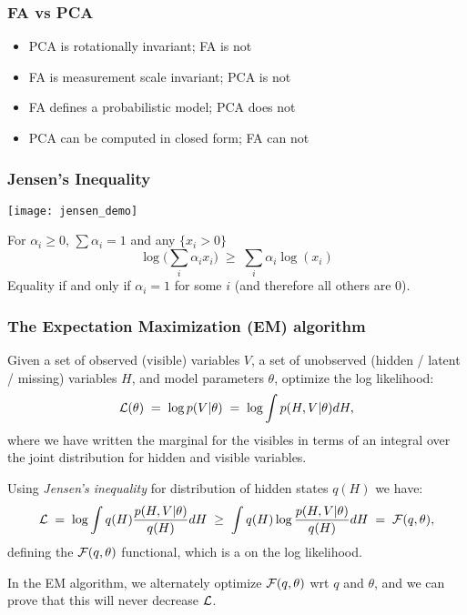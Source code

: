 \begin{frame}
\frametitle{FA vs PCA}
\vfill
\begin{itemize}

\item PCA is rotationally invariant; FA is not

\item FA is measurement scale invariant; PCA is not

\item FA defines a probabilistic model; PCA does not

\item PCA can be computed in closed form; FA can not 
\end{itemize}
\vfill
\end{frame}

\begin{frame}
\frametitle{Jensen's Inequality}

\centerline{\texttt{[image: jensen\_demo]}}

\vfill

For $\alpha_i \ge 0$, $\sum \alpha_i = 1$ and any $\{x_i > 0\}$
%
\[
\log \big( \sum_i \alpha_i x_i \big)\;\ge\;\sum_i \alpha_i \log(x_i)
\]
%
Equality if and only if $\alpha_i =  1$ for some $i$ (and therefore
all others are 0).
\end{frame}


\begin{frame}
\frametitle{The Expectation Maximization (EM) algorithm}

Given a set of observed (visible) variables $V$, a set of unobserved
(hidden / latent / missing) variables $H$, and model parameters
$\theta$, optimize the log likelihood:
%
\begin{equation}
{\cal L}(\theta)\;=\;\log p(V|\theta)\;=\;\log \int p(H,V|\theta)dH,
\end{equation}
%
where we have written the marginal for the visibles in terms of an
integral over the joint distribution for hidden and visible variables.

Using \emph{Jensen's inequality} for  distribution of hidden
states $q(H)$ we have:
%
\begin{equation}
{\cal L}\;=\;\log\int q(H)\frac{p(H,V|\theta)}{q(H)}dH
\;\geq\;\int q(H)\log\frac{p(H,V|\theta)}{q(H)}dH\;=\;{\cal F}(q,\theta),
\end{equation}
%
defining the ${\cal F}(q,\theta)$ functional, which is a 
on the log likelihood.

In the EM algorithm, we alternately optimize ${\cal F}(q,\theta)$ wrt
$q$ and $\theta$, and we can prove that this will never decrease
${\cal L}$.
\end{frame}

